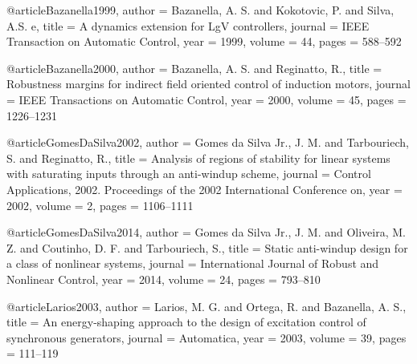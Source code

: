 @article{Bazanella1999,
  author = {Bazanella, A. S. and Kokotovic, P. and Silva, A.S. e},
  title = {A dynamics extension for LgV controllers},
  journal = {IEEE Transaction on Automatic Control},
  year = {1999},
  volume = {44},
  pages = {588--592}
}

@article{Bazanella2000,
  author = {Bazanella, A. S. and Reginatto, R.},
  title = {Robustness margins for indirect field oriented control of induction motors},
  journal = {IEEE Transactions on Automatic Control},
  year = {2000},
  volume = {45},
  pages = {1226--1231}
}

@article{GomesDaSilva2002,
  author = {Gomes da Silva Jr., J. M. and Tarbouriech, S. and Reginatto, R.},
  title = {Analysis of regions of stability for linear systems with saturating inputs through an anti-windup scheme},
  journal = {Control Applications, 2002. Proceedings of the 2002 International Conference on},
  year = {2002},
  volume = {2},
  pages = {1106--1111}
}

@article{GomesDaSilva2014,
  author = {Gomes da Silva Jr., J. M. and Oliveira, M. Z. and Coutinho, D. F. and Tarbouriech, S.},
  title = {Static anti-windup design for a class of nonlinear systems},
  journal = {International Journal of Robust and Nonlinear Control},
  year = {2014},
  volume = {24},
  pages = {793--810}
}

@article{Larios2003,
  author = {Larios, M. G. and Ortega, R. and Bazanella, A. S.},
  title = {An energy-shaping approach to the design of excitation control of synchronous generators},
  journal = {Automatica},
  year = {2003},
  volume = {39},
  pages = {111--119}
}

